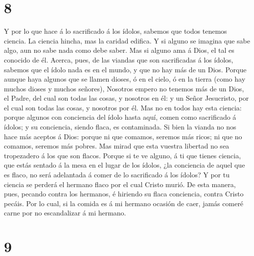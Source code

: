\hypertarget{section-7}{%
\section{8}\label{section-7}}

 Y por lo que hace á lo sacrificado á los ídolos, sabemos
que todos tenemos ciencia. La ciencia hincha, mas la caridad edifica.
 Y si alguno se imagina que sabe algo, aun no sabe nada como
debe saber.  Mas si alguno ama á Dios, el tal es conocido de
él.  Acerca, pues, de las viandas que son sacrificadas á los
ídolos, sabemos que el ídolo nada es en el mundo, y que no hay más de un
Dios.  Porque aunque haya algunos que se llamen dioses, ó en
el cielo, ó en la tierra (como hay muchos dioses y muchos señores),
 Nosotros empero no tenemos más de un Dios, el Padre, del
cual son todas las cosas, y nosotros en él: y un Señor Jesucristo, por
el cual son todas las cosas, y nosotros por él.  Mas no en
todos hay esta ciencia: porque algunos con conciencia del ídolo hasta
aquí, comen como sacrificado á ídolos; y su conciencia, siendo flaca, es
contaminada.  Si bien la vianda no nos hace más aceptos á
Dios: porque ni que comamos, seremos más ricos; ni que no comamos,
seremos más pobres.  Mas mirad que esta vuestra libertad no
sea tropezadero á los que son flacos.  Porque si te ve
alguno, á ti que tienes ciencia, que estás sentado á la mesa en el lugar
de los ídolos, ¿la conciencia de aquel que es flaco, no será adelantada
á comer de lo sacrificado á los ídolos?  Y por tu ciencia
se perderá el hermano flaco por el cual Cristo murió.  De
esta manera, pues, pecando contra los hermanos, é hiriendo su flaca
conciencia, contra Cristo pecáis.  Por lo cual, si la
comida es á mi hermano ocasión de caer, jamás comeré carne por no
escandalizar á mi hermano.

\hypertarget{section-8}{%
\section{9}\label{section-8}}

